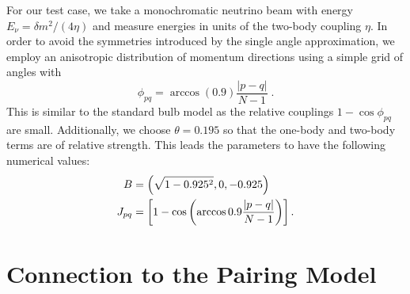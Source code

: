 \documentclass[10pt]{article}
\begin{document}
For our test case, we take a monochromatic neutrino beam with energy $E_\nu=\delta m^2/(4\eta)$ and measure energies in units of the two-body coupling $\eta$. In order to avoid the symmetries introduced by the single angle approximation, we employ an anisotropic distribution of momentum directions
using a simple grid of angles with
\begin{equation}
\phi_{pq} = \arccos(0.9) \frac{|p-q|}{N-1}\;.
\end{equation}
This is similar to the standard bulb model as the relative couplings $1- \cos\phi_{pq}$ are small. Additionally, we choose $\theta=0.195$ so that the one-body and two-body terms are of relative strength. This leads the parameters to have the following numerical values:
\begin{align}
B&=\left(\sqrt{1-0.925^2},0,-0.925\right)
\\
J_{pq}&=\left[1-\cos\left(\arccos{0.9}\frac{\abs{p-q}}{N-1}\right)\right]
.\end{align}

\section{Connection to the Pairing Model}
\end{document}
